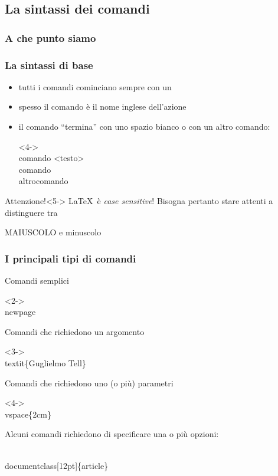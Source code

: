 \documentclass[10pt,svgnames,%
ucs,%
pdftex]{mybeamer}
\begin{document}
\subsection{La sintassi dei comandi}
\begin{frame}
	\frametitle{A che punto siamo}
\end{frame}
\begin{frame}
	\frametitle{La sintassi di base}
	\begin{itemize}[<+->]
		\item tutti i comandi cominciano sempre con un
		\LCmd\
		\item spesso il comando \`e il nome inglese dell'azione
		\item il comando ``termina'' con uno spazio bianco o con un
		altro comando:
		\begin{LaTeXcode}<4->
			\\comando \alert{<testo>}\n
			\\comando\\altrocomando
		\end{LaTeXcode}
	\end{itemize}
	\smallskip
	\begin{block}{Attenzione!}<5->
		\LaTeX\ \`e \textit{case sensitive}! Bisogna pertanto stare attenti a distinguere tra\\[.2em]
		\begin{center}
			\alert{\large MAIUSCOLO} e \alert{\large minuscolo}
		\end{center}
	\end{block}
\end{frame}
\begin{frame}
	\frametitle{I principali tipi di comandi}\small
	Comandi semplici
	\begin{LaTeXcode}<2->
		\\newpage
	\end{LaTeXcode}
	\medskip
	Comandi che richiedono un argomento
	\begin{LaTeXcode}<3->
		\\textit\{\alert{Guglielmo Tell}\}
	\end{LaTeXcode}
	\medskip
	Comandi che richiedono uno (o pi\`u) parametri
	\begin{LaTeXcode}<4->
		\\vspace\{\alert{2cm}\}
	\end{LaTeXcode}
	\bigskip
	Alcuni comandi richiedono di specificare una o pi\`u opzioni:
	\begin{LaTeXcode}
		\\documentclass[\alert{12pt}]\{article\}
	\end{LaTeXcode}
\end{frame}
\end{document}
